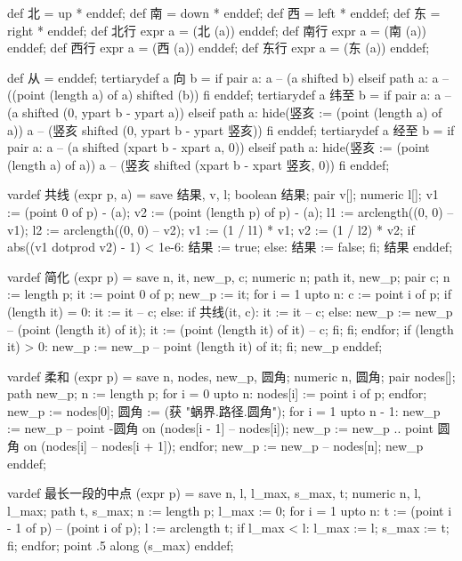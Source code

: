 \startMPinclusions[+]
def 北 = up * enddef; def 南 = down * enddef;
def 西 = left * enddef; def 东 = right * enddef;
def 北行 expr a = (北 (a)) enddef;
def 南行 expr a = (南 (a)) enddef;
def 西行 expr a = (西 (a)) enddef;
def 东行 expr a = (东 (a)) enddef;

def 从 = enddef;
tertiarydef a 向 b =
  if pair a:
    a -- (a shifted b)
  elseif path a:
    a -- ((point (length a) of a) shifted (b))
  fi
enddef;
tertiarydef a 纬至 b = 
  if pair a:
    a -- (a shifted (0, ypart b - ypart a))
  elseif path a:
    hide(竖亥 := (point (length a) of a))
    a -- (竖亥 shifted (0, ypart b - ypart 竖亥))
  fi
enddef;
tertiarydef a 经至 b = 
  if pair a:
    a -- (a shifted (xpart b - xpart a, 0))
  elseif path a:
    hide(竖亥 := (point (length a) of a))
    a -- (竖亥 shifted (xpart b - xpart 竖亥, 0))
  fi
enddef;
\stopMPinclusions

\startMPinclusions[+]
vardef 共线 (expr p, a) =
  save 结果, v, l; boolean 结果; pair v[]; numeric l[];
  v1 := (point 0 of p) - (a);
  v2 := (point (length p) of p) - (a);
  l1 := arclength((0, 0) -- v1); %
  l2 := arclength((0, 0) -- v2); %
  v1 := (1 / l1) * v1; v2 := (1 / l2) * v2;
  if abs((v1 dotprod v2) - 1) < 1e-6:
     结果 := true;
  else:
    结果 := false;
  fi;
  结果
enddef;

vardef 简化 (expr p) =
  save n, it, new_p, c;
  numeric n; path it, new_p; pair c;
  n := length p;
  it := point 0 of p;
  new_p := it;
  for i = 1 upto n:
    c := point i of p;
    if (length it) = 0: 
      it := it -- c;
    else:
      if 共线(it, c):
        it := it -- c;
      else:
        new_p := new_p -- (point (length it) of it);
        it := (point (length it) of it) -- c;
      fi;
    fi;
  endfor;
  if (length it) > 0:
    new_p := new_p -- point (length it) of it;
  fi;
  new_p
enddef;

vardef 柔和 (expr p) =
  save n, nodes, new_p, 圆角; 
  numeric n, 圆角; pair nodes[]; path new_p;
  n := length p;
  for i = 0 upto n:
    nodes[i] := point i of p;
  endfor;
  new_p := nodes[0];
  圆角 := (获 "蜗界.路径.圆角");
  for i = 1 upto n - 1:
    new_p := new_p -- point -圆角 on (nodes[i - 1] -- nodes[i]);
    new_p := new_p .. point 圆角 on (nodes[i] -- nodes[i + 1]);
  endfor;
  new_p := new_p -- nodes[n];
  new_p
enddef;
\stopMPinclusions

\startMPinclusions[+]
vardef 最长一段的中点 (expr p) =
  save n, l, l_max, s_max, t;
  numeric n, l, l_max; path t, s_max;
  n := length p;
  l_max := 0;
  for i = 1 upto n:
    t := (point i - 1 of p) -- (point i of p);
    l := arclength t;
    if l_max < l:
      l_max := l; s_max := t;
    fi;
  endfor;
  point .5 along (s_max)
enddef;

